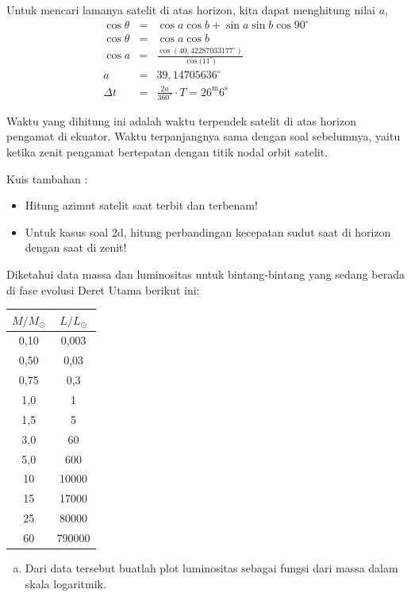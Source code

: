 \documentclass[11pt,fleqn]{exam}
\begin{document}
\begin{questions}
\begin{enumerate}[a.]
    Untuk mencari lamanya satelit di atas horizon, kita dapat menghitung nilai $a$,
    \begin{eqnarray*}
        \cos{\theta} &=& \cos{a} \cos{b} + \sin{a} \sin{b} \cos{90^\circ}\\
        \cos{\theta} &=& \cos{a} \cos{b}\\
        \cos{a}  &=& \frac{\cos{(40,42287033177^{\circ})}}{\cos{(11^\circ})}\\
        a &=& 39,14705636^\circ\\
        \Delta t &=& \frac{2 a}{360^{\circ}} \cdot T = 26^\text{m} 6^\text{s}
    \end{eqnarray*}

    Waktu yang dihitung ini adalah waktu terpendek satelit di atas horizon pengamat di ekuator. Waktu terpanjangnya sama dengan soal sebelumnya, yaitu ketika zenit pengamat bertepatan dengan titik nodal orbit satelit.
    
    Kuis tambahan  : 
    \begin{itemize}
        \item Hitung azimut satelit saat terbit dan terbenam!
        \item Untuk kasus soal 2d, hitung perbandingan kecepatan sudut saat di horizon dengan saat di zenit!
    \end{itemize}
\end{enumerate}


\newpage
\question Diketahui data massa dan luminositas untuk bintang-bintang yang sedang berada di fase evolusi Deret Utama berikut ini:
\begin{table}[!h]
    \centering
    \begin{tabular}{|c|c|}
    \hline
    $M/M_\odot$ & $L/L_\odot$ \\
    \hline
          0,10 & 0,003 \\
     \hline
          0,50 & 0,03 \\
     \hline
          0,75 & 0,3 \\
     \hline
          1,0 & 1 \\
     \hline
          1,5 & 5 \\
     \hline
          3,0 & 60 \\
     \hline
          5,0 & 600 \\
     \hline
          10 & 10000 \\
     \hline
          15 & 17000 \\
     \hline
          25 & 80000 \\
     \hline
          60 & 790000 \\
     \hline
    \end{tabular}
    \label{tab:tabel_no3}
\end{table}
\begin{enumerate}[a.]
    \item Dari data tersebut buatlah plot luminositas sebagai fungsi dari massa dalam skala logaritmik.
    

\end{enumerate}
\end{questions}
\end{document}
